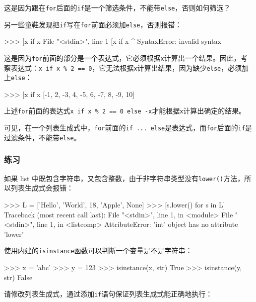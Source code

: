 这是因为跟在\texttt{for}后面的\texttt{if}是一个筛选条件，不能带\texttt{else}，否则如何筛选？

另一些童鞋发现把\texttt{if}写在\texttt{for}前面必须加\texttt{else}，否则报错：

\begin{pythoncode}
>>> [x if x %
  File "<stdin>", line 1
    [x if x %
                       ^
SyntaxError: invalid syntax
\end{pythoncode}

这是因为\texttt{for}前面的部分是一个表达式，它必须根据\texttt{x}计算出一个结果。因此，考察表达式：\texttt{x\ if\ x\ \%\ 2\ ==\ 0}，它无法根据\texttt{x}计算出结果，因为缺少\texttt{else}，必须加上\texttt{else}：

\begin{pythoncode}
>>> [x if x %
[-1, 2, -3, 4, -5, 6, -7, 8, -9, 10]
\end{pythoncode}

上述\texttt{for}前面的表达式\texttt{x\ if\ x\ \%\ 2\ ==\ 0\ else\ -x}才能根据\texttt{x}计算出确定的结果。

可见，在一个列表生成式中，\texttt{for}前面的\texttt{if\ ...\ else}是表达式，而\texttt{for}后面的\texttt{if}是过滤条件，不能带\texttt{else}。

\hypertarget{ux7ec3ux4e60}{%
\subsubsection{练习}\label{ux7ec3ux4e60}}

如果 list
中既包含字符串，又包含整数，由于非字符串类型没有\texttt{lower()}方法，所以列表生成式会报错：

\begin{pythoncode}
>>> L = ['Hello', 'World', 18, 'Apple', None]
>>> [s.lower() for s in L]
Traceback (most recent call last):
  File "<stdin>", line 1, in <module>
  File "<stdin>", line 1, in <listcomp>
AttributeError: 'int' object has no attribute 'lower'
\end{pythoncode}

使用内建的\texttt{isinstance}函数可以判断一个变量是不是字符串：

\begin{pythoncode}
>>> x = 'abc'
>>> y = 123
>>> isinstance(x, str)
True
>>> isinstance(y, str)
False
\end{pythoncode}

请修改列表生成式，通过添加\texttt{if}语句保证列表生成式能正确地执行：

